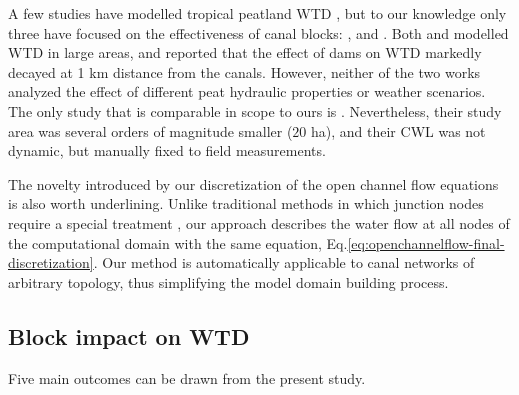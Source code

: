 \documentclass[bg, manuscript]{copernicus}
\begin{document}
A few studies have modelled tropical peatland WTD \citep{cobbHowTemporalPatterns2017, cobbScalarSimulationParameterization2019, bairdDigiBogPeatlandDevelopment2012, bairdHighPermeabilityExplains2017, morrisDigiBogPeatlandDevelopment2012, wostenTropicalPeatlandWater2006}, but to our knowledge only three have focused on the effectiveness of canal blocks: \cite{jaenickePlanningHydrologicalRestoration2010}, \cite{ishiiGroundwaterPeatland2016} and \cite{putraModellingPerformanceBunds2022}.
Both \cite{jaenickePlanningHydrologicalRestoration2010} and \cite{ishiiGroundwaterPeatland2016} modelled WTD in large areas, and reported that the  effect of dams on  WTD markedly decayed at 1 \unit{km} distance from the canals.
However, neither of the two works analyzed the effect of different  peat hydraulic properties or weather scenarios.
The only study that is comparable in scope to ours is \cite{putraModellingPerformanceBunds2022}.
Nevertheless, their study area was several orders of magnitude smaller ($20$ \unit{ha}), and their CWL was not dynamic, but manually fixed to field measurements.

The  novelty introduced by our discretization of the open channel flow equations is also worth underlining.
Unlike traditional methods in which junction nodes require a special treatment \citep{cungePracticalAspectsComputational1980, novakHydraulicModellingIntroduction2010}, our approach describes the water flow at all nodes of the computational domain with the same equation, Eq.\eqref{eq:openchannelflow-final-discretization}.
Our method is automatically applicable to canal networks of arbitrary topology, thus simplifying the model domain building process.

\subsection{Block impact on WTD}
Five main outcomes can be drawn from the present study.
\end{document}
